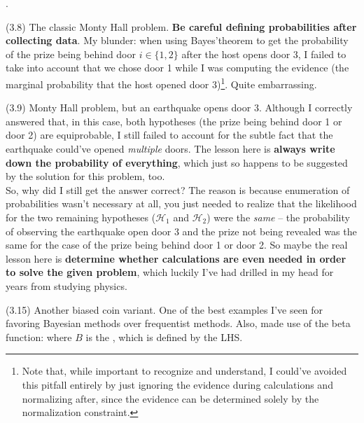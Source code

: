 \documentclass[11pt]{article}
\begin{document}
\myspace
\p {}. 
\begin{compactitem}
	\item[(3.8)] The classic Monty Hall problem. \textbf{Be careful defining probabilities after collecting data}. My blunder: when using Bayes'theorem to get the probability of the prize being behind door $i \in \{1,2\}$ after the host opens door 3, I failed to take into account that we chose door 1 while I was computing the evidence (the marginal probability that the host opened door 3)\footnote{Note that, while important to recognize and understand, I could've avoided this pitfall entirely by just ignoring the evidence during calculations and normalizing after, since the evidence can be determined solely by the normalization constraint.}. Quite embarrassing. 
	
	\item[(3.9)] Monty Hall problem, but an earthquake opens door 3. Although I correctly answered that, in this case, both hypotheses (the prize being behind door 1 or door 2) are equiprobable, I still failed to account for the subtle fact that the earthquake could've opened \textit{multiple} doors. The lesson here is \textbf{always write down the probability of everything}, which just so happens to be suggested by the solution for this problem, too.\\
	
	So, why did I still get the answer correct? The reason is because enumeration of probabilities wasn't necessary at all, you just needed to realize that the likelihood for the two remaining hypotheses ($\mathcal{H}_1$ and $\mathcal{H}_2$) were the \textit{same} -- the probability of observing the earthquake open door 3 and the prize not being revealed was the same for the case of the prize being behind door 1 or door 2. So maybe the real lesson here is \textbf{determine whether calculations are even needed in order to solve the given problem}, which luckily I've had drilled in my head for years from studying physics. 
	
	\item[(3.15)] Another biased coin variant. One of the best examples I've seen for favoring Bayesian methods over frequentist methods. Also, made use of the beta function:
	where $B$ is the , which is defined by the LHS.
\end{compactitem}
\end{document}
